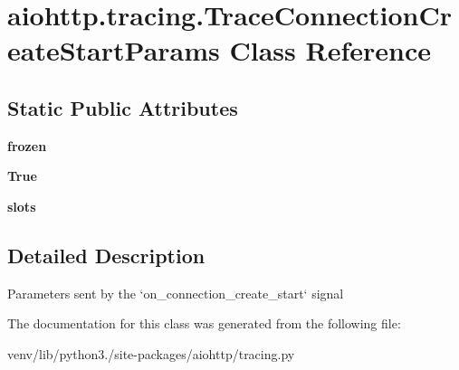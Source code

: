 \hypertarget{classaiohttp_1_1tracing_1_1_trace_connection_create_start_params}{}\section{aiohttp.\+tracing.\+Trace\+Connection\+Create\+Start\+Params Class Reference}
\label{classaiohttp_1_1tracing_1_1_trace_connection_create_start_params}
\subsection*{Static Public Attributes}
\begin{DoxyCompactItemize}
\item 
\mbox{\label{classaiohttp_1_1tracing_1_1_trace_connection_create_start_params_abe35eb7f972155bd20d9def705a3bc5b}} 
{\bfseries frozen}
\item 
\mbox{\label{classaiohttp_1_1tracing_1_1_trace_connection_create_start_params_a5c5e9e483666877d5bd0795c59bff392}} 
{\bfseries True}
\item 
\mbox{\label{classaiohttp_1_1tracing_1_1_trace_connection_create_start_params_a4370729f77da48dcb07d5cf7441311d0}} 
{\bfseries slots}
\end{DoxyCompactItemize}


\subsection{Detailed Description}
\begin{DoxyVerb}Parameters sent by the `on_connection_create_start` signal\end{DoxyVerb}
 

The documentation for this class was generated from the following file\+:\begin{DoxyCompactItemize}
\item 
venv/lib/python3./site-\/packages/aiohttp/tracing.\+py\end{DoxyCompactItemize}
